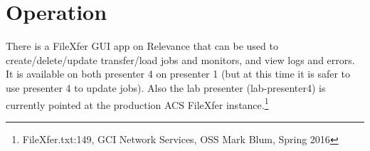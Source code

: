 
\newpage
\section{Operation}

There is a FileXfer GUI app on Relevance that can be used to
create/delete/update transfer/load jobs and monitors, and view
logs and errors.  It is available on both presenter 4 on
presenter 1 (but at this time it is safer to use presenter 4 to
update jobs). Also the lab presenter (lab-presenter4) is
currently pointed at the production ACS FileXfer
instance.\footnote{FileXfer.txt:149, GCI Network Services,
OSS Mark Blum, Spring 2016}\\







